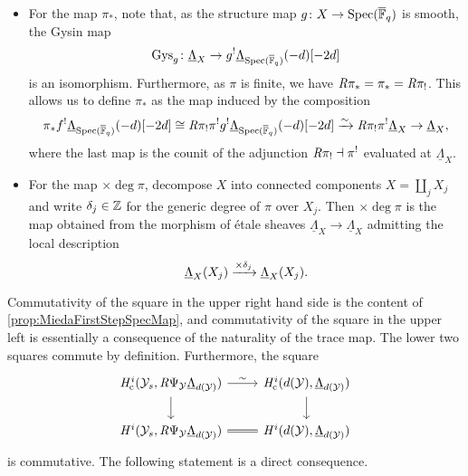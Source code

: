 \documentclass[../main.tex]{subfiles}
\begin{document}
\begin{itemize}
  \item For the map $\pi_*$, note that, as the structure map $g\colon X \to \operatorname{Spec}({\overline {\mathbb{F}}_q})$ is smooth, the Gysin map 
    \begin{equation*}
    \mathrm{Gys}_g \colon \underline \Lambda_{X} \to g^! \underline
    \Lambda_{\operatorname{Spec}({\overline {\mathbb{F}}_q})}(-d)[-2d] 
    \end{equation*}
    is an isomorphism. 
    Furthermore, as $\pi$ is finite, we have $\mathit R \pi_* = \pi_* =
    \mathit R \pi_!$. This allows us to define $\pi_*$ as the map induced by the
    composition
    \begin{equation*}
      \pi_* f^! \underline \Lambda_{\operatorname{Spec}({\overline {\mathbb{F}}_q})}(-d)[-2d]
      \cong \mathit R\pi_! \pi^! g^! \underline \Lambda_{\operatorname{Spec}({\overline {\mathbb{F}}_q})}(-d)[-2d] 
      \xrightarrow{\sim} \mathit R \pi_! \pi^! \underline \Lambda_{X}
      \to \underline \Lambda_{X},
    \end{equation*}
    where the last map is the counit of the adjunction $\mathit R \pi_! \dashv \pi^!$
    evaluated at $\underline \Lambda_{X}$.
  \item For the map $\times \deg \pi$, decompose $X$ into connected components
    $X = \coprod_j X_j$ and write $\delta_j \in \mathbb{Z}$ for the generic degree of 
    $\pi$ over $X_j$. Then $\times \deg\pi$ is the map obtained from the morphism
    of \'etale sheaves $\underline \Lambda_X \to \underline \Lambda_X$ admitting
    the local description
    \begin{equation*}
      \underline \Lambda_{X}(X_j) \xrightarrow{\times \delta_j} \underline \Lambda_{X}(X_j).
    \end{equation*}
\end{itemize}
Commutativity of the square in the upper right hand side is the content of
\cref{prop:MiedaFirstStepSpecMap}, and commutativity of the square in the
upper left is essentially a consequence of the naturality of the trace map. The
lower two squares commute by definition. Furthermore, the square
\begin{equation*}
\begin{tikzcd}[ampersand replacement=\&]
	{\hHc^i(\cY_s, \derR \Psi_\cY \underline \Lambda_{d(\cY)})} \& 
  {\hHc^i(d(\cY), \underline \Lambda_{d(\cY)})} \\
	{\hH^i(\cY_s, \derR \Psi_\cY \underline \Lambda_{d(\cY)})} \& 
  {\hH^i(d(\cY), \underline \Lambda_{d(\cY)})} 
	\arrow["\sim", from=1-1, to=1-2]
	\arrow[from=1-1, to=2-1]
	\arrow[from=1-2, to=2-2]
	\arrow[Rightarrow, no head, from=2-1, to=2-2]
\end{tikzcd}
\end{equation*}
is commutative. The following statement is a direct consequence.
\end{document}
